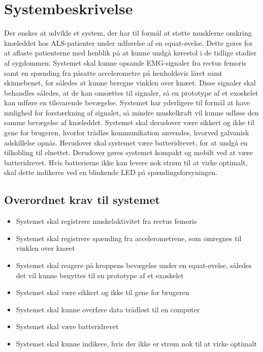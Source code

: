\section{Systembeskrivelse}
Der ønskes at udvikle et system, der har til formål at støtte musklerne omkring knæleddet hos ALS-patienter under udførelse af en squat-øvelse. Dette gøres for at aflaste patienterne med henblik på at kunne undgå kørestol i de tidlige stadier af sygdommen. 
Systemet skal kunne opsamle EMG-signaler fra rectus femoris samt en spænding fra påsatte accelerometre på henholdsvis låret samt skinnebenet, for således at kunne beregne vinklen over knæet. Disse signaler skal behandles således, at de kan omsættes til signaler, så en prototype af et exoskelet kan udføre en tilsvarende bevægelse. 
Systemet har yderligere til formål at have mulighed for forstærkning af signalet, så mindre muskelkraft vil kunne udløse den samme bevægelse af knæleddet. 
Systemet skal derudover være sikkert og ikke til gene for brugeren, hvorfor trådløs kommunikation anvendes, hvorved galvanisk adskillelse opnås. Herudover skal systemet være batteridrevet, for at undgå en tilkobling til elnettet. Derudover gøres systemet kompakt og mobilt ved at være batteridrevet. Hvis batterierne ikke kan levere nok strøm til at virke optimalt, skal dette indikeres ved en blinkende LED på spændingsforsyningen. 

\subsection{Overordnet krav til systemet}  \label{sec:overordnet_krav}
\begin{itemize}
\item Systemet skal registrere muskelaktivitet fra rectus femoris 
\item Systemet skal registrere spænding fra accelerometrene, som omregnes til vinklen over knæet
\item Systemet skal reagere på kroppens bevægelse under en squat-øvelse, således det vil kunne benyttes til en prototype af et exoskelet
\item Systemet skal være sikkert og ikke til gene for brugeren 
\item Systemet skal kunne overføre data trådløst til en computer
\item Systemet skal være batteridrevet
\item Systemet skal kunne indikere, hvis der ikke er strøm nok til at virke optimalt
\end{itemize}


